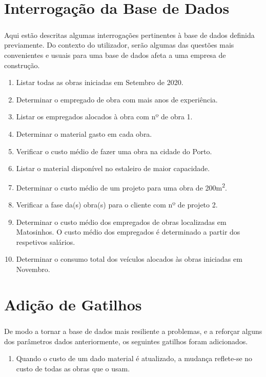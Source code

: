 \documentclass{report}
\begin{document}
	\chapter{Interrogação da Base de Dados}
		
		\paragraph{}Aqui estão descritas algumas interrogações pertinentes à base de dados
		definida previamente. Do contexto do utilizador, serão algumas das questões
		mais convenientes e usuais para uma base de dados afeta a uma empresa de construção.\\	
		
		\begin{enumerate}
			\item Listar todas as obras iniciadas em Setembro de 2020.
			\item Determinar o empregado de obra com mais anos de experiência.
			\item Listar os empregados alocados à obra com nº de obra 1.
			\item Determinar o material gasto em cada obra.
			\item Verificar o custo médio de fazer uma obra na cidade do Porto.
			\item Listar o material disponível no estaleiro de maior capacidade.
			\item Determinar o custo médio de um projeto para uma obra de 
			200m\textsuperscript{2}.
			\item Verificar a fase da(s) obra(s) para o cliente com nº de projeto 2.
			\item Determinar o custo médio dos empregados de obras localizadas em Matosinhos.
			O custo médio dos empregados é determinado a partir dos respetivos salários.
			\item Determinar o consumo total dos veículos alocados às obras iniciadas em 
			Novembro.
		\end{enumerate}		
	\chapter{Adição de Gatilhos}
		
		\paragraph{}De modo a tornar a base de dados mais resiliente a problemas, e a reforçar
		alguns dos parâmetros dados anteriormente, os seguintes gatilhos foram adicionados.
		
		\begin{enumerate}
		\item Quando o custo de um dado material é atualizado, a mudança reflete-se no custo 
		de todas as obras que o usam.
		\end{enumerate}
					
		
\end{document}
